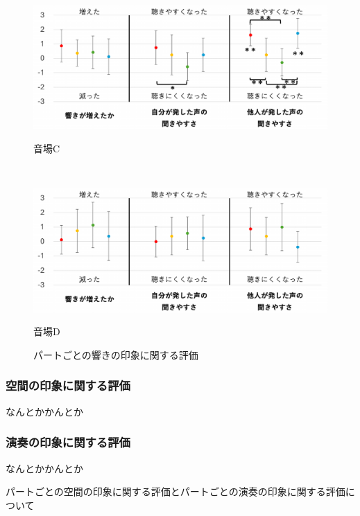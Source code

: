\documentclass[11pt,a4j]{jreport}
\begin{document}
\begin{figure}[H]
\begin{minipage}{1\linewidth}
      \centering
      \includegraphics[scale=.55]{images/subjectiveExp/statisticAnalysis/part_reverb_c.pdf}
      \caption*{音場C}
      \label{fig:響きの印象C}
    \end{minipage}
    \\
    \vspace{1\baselineskip}
    \begin{minipage}{1\linewidth}
      \centering
      \includegraphics[scale=.55]{images/subjectiveExp/statisticAnalysis/part_reverb_d.pdf}
      \caption*{音場D}
      \label{fig:響きの印象D}
    \end{minipage}
    
    \caption{パートごとの響きの印象に関する評価}
    \label{fig:パートごとの響きの印象に関する評価}
  \end{figure}


  \clearpage
  \subsubsection*{空間の印象に関する評価}
  なんとかかんとか

  \subsubsection*{演奏の印象に関する評価}
  なんとかかんとか

  パートごとの空間の印象に関する評価とパートごとの演奏の印象に関する評価について
\end{document}
